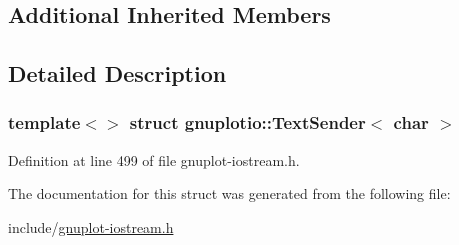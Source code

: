 \subsection*{Additional Inherited Members}


\subsection{Detailed Description}
\subsubsection*{template$<$$>$\newline
struct gnuplotio\+::\+Text\+Sender$<$ char $>$}



Definition at line 499 of file gnuplot-\/iostream.\+h.



The documentation for this struct was generated from the following file\+:\begin{DoxyCompactItemize}
\item 
include/\hyperlink{gnuplot-iostream_8h}{gnuplot-\/iostream.\+h}\end{DoxyCompactItemize}
